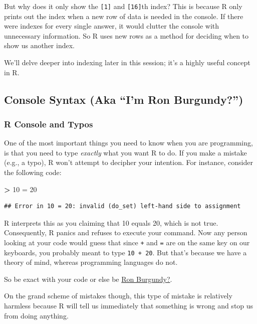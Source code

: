\documentclass[
]{book}
\newenvironment{Shaded}{\begin{snugshade}}{\end{snugshade}}
\newcommand{\DecValTok}[1]{\textcolor[rgb]{0.00,0.00,0.81}{#1}}
\newcommand{\OtherTok}[1]{\textcolor[rgb]{0.56,0.35,0.01}{#1}}
\newcommand{\SpecialCharTok}[1]{\textcolor[rgb]{0.81,0.36,0.00}{\textbf{#1}}}
\begin{document}
But why does it only show the \texttt{{[}1{]}} and \texttt{{[}16{]}}th index? This is because R only prints out the index when a new row of data is needed in the console. If there were indexes for every single answer, it would clutter the console with unnecessary information. So R uses new rows as a method for deciding when to show us another index.

We'll delve deeper into indexing later in this session; it's a highly useful concept in R.

\subsection{Console Syntax (Aka ``I'm Ron Burgundy?'')}\label{console-syntax-aka-im-ron-burgundy}

\subsubsection{R Console and Typos}\label{r-console-and-typos}

One of the most important things you need to know when you are programming, is that you need to type \emph{exactly} what you want R to do. If you make a mistake (e.g., a typo), R won't attempt to decipher your intention. For instance, consider the following code:

\begin{Shaded}
\begin{Highlighting}[]
\SpecialCharTok{\textgreater{}} \DecValTok{10} \OtherTok{=} \DecValTok{20}
\end{Highlighting}
\end{Shaded}

\begin{verbatim}
## Error in 10 = 20: invalid (do_set) left-hand side to assignment
\end{verbatim}

R interprets this as you claiming that 10 equals 20, which is not true. Consequently, R panics and refuses to execute your command. Now any person looking at your code would guess that since \texttt{+} and \texttt{=} are on the same key on our keyboards, you probably meant to type \texttt{10\ +\ 20}. But that's because we have a theory of mind, whereas programming languages do not.

So be exact with your code or else be \href{https://www.youtube.com/watch?v=X3zfP14pLxc}{Ron Burgundy?}.

On the grand scheme of mistakes though, this type of mistake is relatively harmless because R will tell us immediately that something is wrong and stop us from doing anything.
\end{document}
